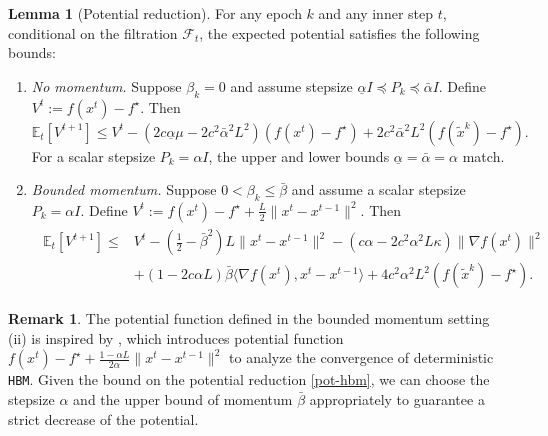 \documentclass{article}
\theoremstyle{definition}
\newtheorem{lemma}[lemma]{Lemma}
\newtheorem{remark}[remark]{Remark}
\newcommand{\assign}{:=}
\newcommand{\hbm}{\texttt{HBM}}
\begin{document}
\begin{lemma}[Potential reduction]
  \label{lem:vr-pot}
  For any epoch $k$ and any inner step $t$, conditional on the filtration $\mathcal{F}_t$, the expected potential satisfies the following bounds:
  \begin{enumerate}
    \item \emph{No momentum.} Suppose $\beta_k = 0$ and assume stepsize
    $\underline{\alpha} I \preceq P_k \preceq \bar{\alpha} I$. Define $V^t \assign f (x^t) - f^{\star}$. Then
    \begin{equation}
      \mathbb{E}_{t} [V^{t + 1}] \leq V^t - \left( 2 c \underline{\alpha} \mu - 2 c^2 \bar{\alpha}^2L^2 \right) (f (x^t) - f^{\star}) + 2 c^2 \bar{\alpha}^2 L^2 (f
    (\tilde{x}^k) - f^{\star}). \label{pot-svrg}
    \end{equation}
    For a scalar stepsize $P_k = \alpha I$, the upper and lower bounds $\underline{\alpha} = \bar{\alpha} = \alpha$ match.
    
    \item \emph{Bounded momentum.} Suppose $0 < \beta_k \leq  \bar{\beta}$ and assume a scalar stepsize $P_k = \alpha I$. Define $V^t \assign f(x^t) - f^{\star} + \tfrac{L}{2} \| x^t - x^{t - 1} \|^2$. Then
    \begin{align}
      \begin{split}
        \mathbb{E}_{t} [V^{t + 1}]  \leq{} & V^t - \left( \tfrac{1}{2} - \bar{\beta}^2 \right) L \| x^t - x^{t-1} \|^2 - (c\alpha - 2 c^2 \alpha^2 L \kappa) \| \nabla f (x^t) \|^2\\
      &+ (1 - 2 c \alpha L) \bar{\beta} \langle \nabla f (x^t), x^t - x^{t-1} \rangle + 4
      c^2 \alpha^2 L^2 (f (\tilde{x}^k) - f^{\star}).
      \end{split}
      \label{pot-hbm}
    \end{align}
  \end{enumerate}
\end{lemma}

\begin{remark}
  The potential function defined in the bounded momentum setting (ii) is inspired by {\cite{kulakova2018non}}, which introduces potential function $f (x^t) - f^{\star} + \tfrac{1 - \alpha L}{2 \alpha} \| x^t - x^{t - 1} \|^2$ to analyze the convergence of deterministic {\hbm}. Given the bound on the potential reduction \eqref{pot-hbm}, we can choose the stepsize $\alpha$ and the upper bound of momentum $\bar \beta$ appropriately to guarantee a strict decrease of the potential.
\end{remark}
\end{document}
